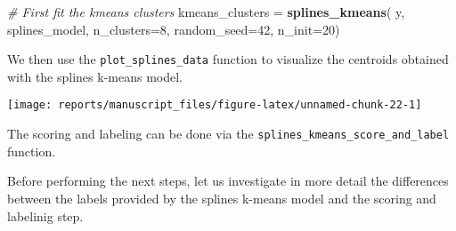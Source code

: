 \documentclass[9pt,a4paper,]{extarticle}
\newenvironment{Shaded}{\begin{snugshade}}{\end{snugshade}}
\newcommand{\CommentTok}[1]{\textcolor[rgb]{0.56,0.35,0.01}{\textit{#1}}}
\newcommand{\DataTypeTok}[1]{\textcolor[rgb]{0.13,0.29,0.53}{#1}}
\newcommand{\DecValTok}[1]{\textcolor[rgb]{0.00,0.00,0.81}{#1}}
\newcommand{\KeywordTok}[1]{\textcolor[rgb]{0.13,0.29,0.53}{\textbf{#1}}}
\newcommand{\NormalTok}[1]{#1}
\newcommand{\OperatorTok}[1]{\textcolor[rgb]{0.81,0.36,0.00}{\textbf{#1}}}
\newcommand{\OtherTok}[1]{\textcolor[rgb]{0.56,0.35,0.01}{#1}}
\newcommand{\StringTok}[1]{\textcolor[rgb]{0.31,0.60,0.02}{#1}}
\begin{document}
\begin{Shaded}
\begin{Highlighting}[]
\CommentTok{# First fit the kmeans clusters}
\NormalTok{kmeans_clusters =}\StringTok{ }\KeywordTok{splines_kmeans}\NormalTok{(}
\NormalTok{    y, splines_model, }\DataTypeTok{n_clusters=}\DecValTok{8}\NormalTok{,}
    \DataTypeTok{random_seed=}\DecValTok{42}\NormalTok{,}
    \DataTypeTok{n_init=}\DecValTok{20}\NormalTok{)}
\end{Highlighting}
\end{Shaded}

We then use the \texttt{plot\_splines\_data} function to visualize the centroids obtained
with the splines k-means model.

\begin{Shaded}
\end{Shaded}

\begin{center}\texttt{[image: reports/manuscript\_files/figure-latex/unnamed-chunk-22-1]} \end{center}

The scoring and labeling can be done via the \texttt{splines\_kmeans\_score\_and\_label}
function.

\begin{Shaded}
\end{Shaded}

Before performing the next steps, let us investigate in more detail the
differences between the labels provided by the splines k-means model and the
scoring and labelinig step.
\end{document}
